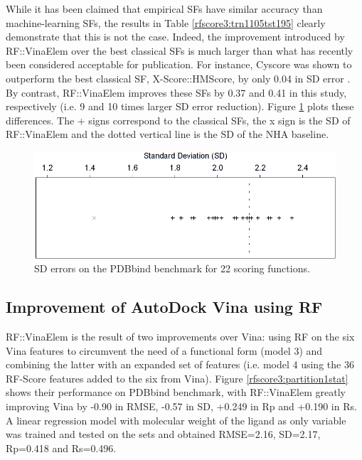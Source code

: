 While it has been claimed \citep{1372} that empirical SFs have similar accuracy than machine-learning SFs, the results in Table \ref{rfscore3:trn1105tst195} clearly demonstrate that this is not the case. Indeed, the improvement introduced by RF::VinaElem over the best classical SFs is much larger than what has recently been considered acceptable for publication. For instance, Cyscore was shown to outperform the best classical SF, X-Score::HMScore, by only 0.04 in SD error \citep{1372}. By contrast, RF::VinaElem improves these SFs by 0.37 and 0.41 in this study, respectively (i.e. 9 and 10 times larger SD error reduction). Figure \ref{rfscore3:StandardDeviations} plots these differences. The + signs correspond to the classical SFs, the x sign is the SD of RF::VinaElem and the dotted vertical line is the SD of the NHA baseline.

\begin{figure}
\centering
\includegraphics[width=\linewidth]{../rfscore3/StandardDeviations.png}
\caption{SD errors on the PDBbind benchmark for 22 scoring functions.}
\label{rfscore3:StandardDeviations}
\end{figure}

\subsection{Improvement of AutoDock Vina using RF}

RF::VinaElem is the result of two improvements over Vina: using RF on the six Vina features to circumvent the need of a functional form (model 3) and combining the latter with an expanded set of features (i.e. model 4 using the 36 RF-Score features added to the six from Vina). Figure \ref{rfscore3:partition1stat} shows their performance on PDBbind benchmark, with RF::VinaElem greatly improving Vina by -0.90 in RMSE, -0.57 in SD, +0.249 in Rp and +0.190 in Rs. A linear regression model with molecular weight of the ligand as only variable was trained and tested on the sets and obtained RMSE=2.16, SD=2.17, Rp=0.418 and Rs=0.496.

